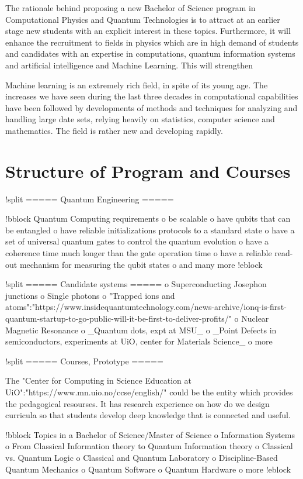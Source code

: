 \documentclass[oneside,final,10pt]{article}
\begin{document}
The rationale behind proposing a new Bachelor of Science program in Computational Physics and Quantum Technologies is to attract at an earlier stage new students with an explicit interest in these topics. Furthermore, it will enhance the recruitment to fields in physics which are in high demand of students and candidates with an expertise in computations, quantum information systems and artificial intelligence and Machine Learning. This will strengthen 

Machine learning  is an extremely rich field, in spite of its young age. The
increases we have seen during the last three decades in computational
capabilities have been followed by developments of methods and
techniques for analyzing and handling large date sets, relying heavily
on statistics, computer science and mathematics.  The field is rather
new and developing rapidly. 

\section{Structure of Program and Courses}

!split
===== Quantum Engineering =====

!bblock Quantum Computing requirements
o be scalable
o have qubits that can be entangled
o have reliable initializations protocols to a standard state
o have a set of universal quantum gates to control the quantum evolution
o have a coherence time much longer than the gate operation time
o have a reliable read-out mechanism for measuring the qubit states
o and many more 
!eblock

!split
===== Candidate systems =====
o Superconducting Josephon junctions
o Single photons
o "Trapped ions and atoms":"https://www.insidequantumtechnology.com/news-archive/ionq-is-first-quantum-startup-to-go-public-will-it-be-first-to-deliver-profits/"
o Nuclear Magnetic Resonance
o _Quantum dots, expt at MSU_
o _Point Defects in semiconductors, experiments at UiO, center for Materials Science_
o more


!split
===== Courses, Prototype =====

The "Center for Computing in Science Education at UiO":"https://www.mn.uio.no/ccse/english/" could be the entity which provides the pedagogical resourses. It has research experience
on how do we design curricula so that students develop deep knowledge that is connected and useful.

!bblock Topics  in a Bachelor of Science/Master of Science
o Information Systems 
o From Classical Information theory to Quantum Information theory
o Classical vs. Quantum Logic
o Classical and Quantum Laboratory 
o Discipline-Based Quantum Mechanics 
o Quantum Software
o Quantum Hardware
o more
!eblock
\end{document}
